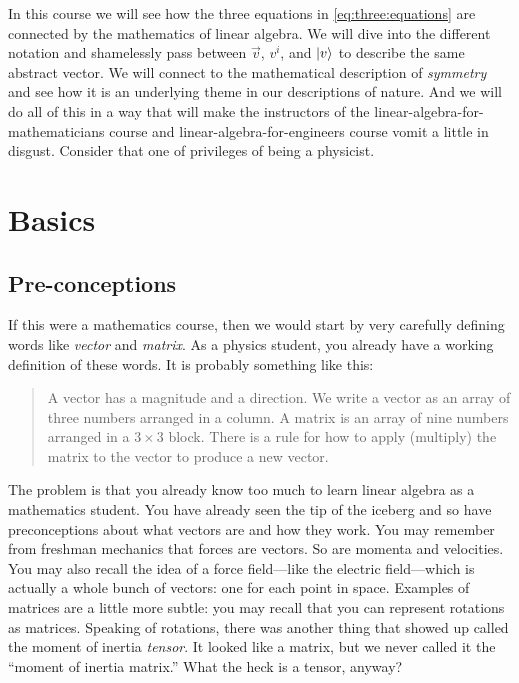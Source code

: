 \documentclass[12pt]{article}
\begin{document}
In this course we will see how the three equations in \eqref{eq:three:equations} are connected by the mathematics of linear algebra. We will dive into the different notation and shamelessly pass between $\vec{v}$, $v^i$, and $\left|v\right\rangle$ to describe the same abstract vector. We will connect to the mathematical description of \emph{symmetry} and see how it is an underlying theme in our descriptions of nature. And we will do all of this in a way that will make the instructors of the linear-algebra-for-mathematicians course and linear-algebra-for-engineers course vomit a little in disgust. Consider that one of privileges of being a physicist.


\section{Basics}

\subsection{Pre-conceptions}

If this were a mathematics course, then we would start by very carefully defining words like \emph{vector} and \emph{matrix}. As a physics student, you already have a working definition of these words. It is probably something like this:
%
\begin{quote}
A vector has a magnitude and a direction. We write a vector as an array of three numbers arranged in a column. A matrix is an array of nine numbers arranged in a $3\times 3$ block. There is a rule for how to apply (multiply) the matrix to the vector to produce a new vector.
\end{quote}

The problem is that you already know too much to learn linear algebra as a mathematics student. You have already seen the tip of the iceberg and so have preconceptions about what vectors are and how they work. You may remember from freshman mechanics that forces are vectors. So are momenta and velocities. You may also recall the idea of a force field---like the electric field---which is actually a whole bunch of vectors: one for each point in space. Examples of matrices are a little more subtle: you may recall that you can represent rotations as matrices. Speaking of rotations, there was another thing that showed up called the moment of inertia \emph{tensor}. It looked like a matrix, but we never called it the ``moment of inertia matrix.'' What the heck is a tensor, anyway?
\end{document}
